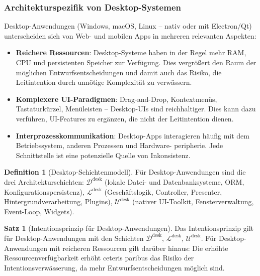 ﻿\documentclass[a4paper,12pt]{article}
\theoremstyle{definition}
\newtheorem{definition}{Definition}
\newtheorem{satz}{Satz}
\begin{document}
\subsubsection{Architekturspezifik von Desktop-Systemen}

Desktop-Anwendungen (Windows, macOS, Linux -- nativ oder mit Electron/Qt)
unterscheiden sich von Web- und mobilen Apps in mehreren relevanten Aspekten:

\begin{itemize}
    \item \textbf{Reichere Ressourcen}: Desktop-Systeme haben in der Regel
          mehr RAM, CPU und persistenten Speicher zur Verfügung. Dies vergrößert
          den Raum der möglichen Entwurfsentscheidungen und damit auch das
          Risiko, die Leitintention durch unnötige Komplexität zu verwässern.
    \item \textbf{Komplexere UI-Paradigmen}: Drag-and-Drop, Kontextmenüs,
          Tastaturkürzel, Menüleisten -- Desktop-UIs sind reichhaltiger.
          Dies kann dazu verführen, UI-Features zu ergänzen, die nicht der
          Leitintention dienen.
    \item \textbf{Interprozesskommunikation}: Desktop-Apps interagieren
          häufig mit dem Betriebssystem, anderen Prozessen und Hardware-
          peripherie. Jede Schnittstelle ist eine potenzielle Quelle von
          Inkonsistenz.
\end{itemize}

\begin{definition}[Desktop-Schichtenmodell]
Für Desktop-Anwendungen sind die drei Architekturschichten:
$\mathcal{D}^{\text{desk}}$ (lokale Datei- und Datenbanksysteme, ORM,
Konfigurationspersistenz),
$\mathcal{L}^{\text{desk}}$ (Geschäftslogik, Controller, Presenter,
Hintergrundverarbeitung, Plugins),
$\mathcal{U}^{\text{desk}}$ (nativer UI-Toolkit, Fensterverwaltung,
Event-Loop, Widgets).
\end{definition}

\begin{satz}[Intentionsprinzip für Desktop-Anwendungen]\label{satz:desktop}
Das Intentionsprinzip gilt für Desktop-Anwendungen mit den Schichten
$\mathcal{D}^{\text{desk}}$, $\mathcal{L}^{\text{desk}}$,
$\mathcal{U}^{\text{desk}}$. Für Desktop-Anwendungen mit reicheren
Ressourcen gilt darüber hinaus: Die erhöhte Ressourcenverfügbarkeit
erhöht ceteris paribus das Risiko der Intentionsverwässerung, da
mehr Entwurfsentscheidungen möglich sind.
\end{satz}
\end{document}
